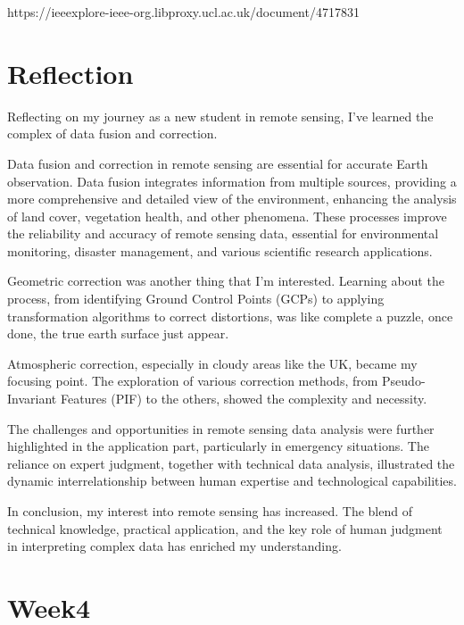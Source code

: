 \documentclass[
  letterpaper,
  DIV=11,
  numbers=noendperiod]{scrreprt}
\begin{document}
https://ieeexplore-ieee-org.libproxy.ucl.ac.uk/document/4717831


\chapter{Reflection}\label{reflection-1}

Reflecting on my journey as a new student in remote sensing, I've
learned the complex of data fusion and correction.

Data fusion and correction in remote sensing are essential for accurate
Earth observation. Data fusion integrates information from multiple
sources, providing a more comprehensive and detailed view of the
environment, enhancing the analysis of land cover, vegetation health,
and other phenomena. These processes improve the reliability and
accuracy of remote sensing data, essential for environmental monitoring,
disaster management, and various scientific research applications.

Geometric correction was another thing that I'm interested. Learning
about the process, from identifying Ground Control Points (GCPs) to
applying transformation algorithms to correct distortions, was like
complete a puzzle, once done, the true earth surface just appear.

Atmospheric correction, especially in cloudy areas like the UK, became
my focusing point. The exploration of various correction methods, from
Pseudo-Invariant Features (PIF) to the others, showed the complexity and
necessity.

The challenges and opportunities in remote sensing data analysis were
further highlighted in the application part, particularly in emergency
situations. The reliance on expert judgment, together with technical
data analysis, illustrated the dynamic interrelationship between human
expertise and technological capabilities.

In conclusion, my interest into remote sensing has increased. The blend
of technical knowledge, practical application, and the key role of human
judgment in interpreting complex data has enriched my understanding.


\chapter{Week4}\label{week4}

\end{document}
